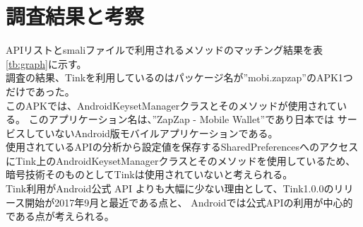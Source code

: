 \newpage
\section{調査結果と考察}

APIリストとsmaliファイルで利用されるメソッドのマッチング結果を表\ref{tb:graph}に示す。\\
調査の結果、Tinkを利用しているのはパッケージ名が”mobi.zapzap”のAPK1つだけであった。
\\このAPKでは、AndroidKeysetManagerクラスとそのメソッドが使用されている。
このアプリケーション名は、”ZapZap - Mobile Wallet”\cite{ZapZap}であり日本では
サービスしていないAndroid版モバイルアプリケーションである。
\\使用されているAPIの分析から設定値を保存するSharedPreferencesへのアクセスにTink上のAndroidKeysetManagerクラスとそのメソッドを使用しているため、
暗号技術そのものとしてTinkは使用されていないと考えられる。
\\Tink利用がAndroid公式 API よりも大幅に少ない理由として、Tink1.0.0のリリース開始が2017年9月と最近である点と、
Androidでは公式APIの利用が中心的である点が考えられる。

